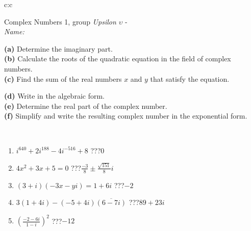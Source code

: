 \documentclass[10pt]{report}
\begin{document}
\begin{tabular}{c:c}
\\ \hdashline
\begin{minipage}[c][104.5mm][t]{0.5\linewidth}
\begin{center}
\vspace{5mm}
{\huge Complex Numbers 1, group \textit{Upsilon $\upsilon$} -}\\[5mm]
\textit{Name:}\phantom{xxxxxxxxxxxxxxxxxxxxxxxxxxxxxxxxxxxxxxxxxxxxxxxxxxxxxxxxxxxxxxxxx}\\[5mm]
\begin{minipage}{0.95\linewidth}
\begin{center}
{\small \begin{minipage}{0.44\textwidth} \raggedright
\textbf{(a)} Determine the imaginary part. \\[1mm]
\textbf{(b)} Calculate the roots of the quadratic equation in the field of complex numbers. \\[1mm]
\textbf{(c)} Find the sum of the real numbers \(x\) and \(y\) that satisfy the equation. \end{minipage} \begin{minipage}{0.54\textwidth}
\textbf{(d)} Write in the algebraic form. \\[1mm]
\textbf{(e)} Determine the real part of the complex number. \\[1mm]
\textbf{(f)} Simplify and write the resulting complex number in the exponential form.
\end{minipage}
} \vspace{3mm}
\end{center}
\end{minipage}
\\[1mm]
\begin{minipage}{0.79\linewidth}
\begin{center}
\begin{varwidth}{\linewidth}
\setlength{\itemsep}{0pt}
\begin{enumerate}
\large
\item $i^{640}+2i^{188}-4i^{-516}+8$\quad \dotfill\; ???\;\dotfill \quad $0$
\item $4x^2+3x+5=0$\quad \dotfill\; ???\;\dotfill \quad $\frac{-3}{8} \pm{}\frac{ \sqrt{151}}{8}i$
\item $(3+i)(-3x-yi)=1+6i$\quad \dotfill\; ???\;\dotfill \quad $-2$
\item $3(1+4i)-(-5+4i)\overline{(6-7i)}$\quad \dotfill\; ???\;\dotfill \quad $89+23i$
\item $\left(\frac{-2-6i}{1-i}\right)^2$\quad \dotfill\; ???\;\dotfill \quad $-12$

\end{enumerate}
\end{varwidth}
\end{center}
\end{minipage}
\end{center}
\end{minipage}
\end{tabular}
\end{document}

